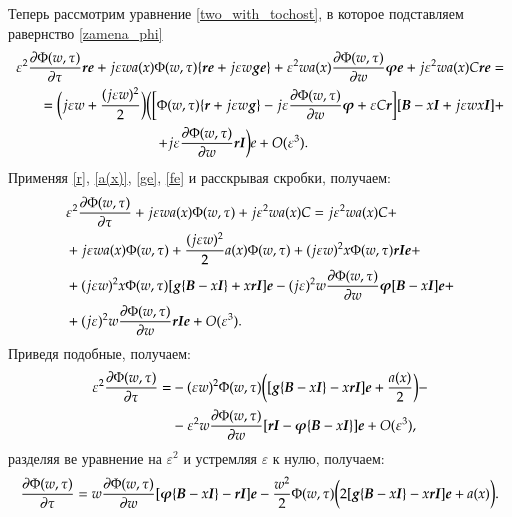 Теперь рассмотрим уравнение \eqref{two_with_tochost}, в которое подставляем равернство \eqref{zamena_phi}
\begin{align*}
	\varepsilon^2 \pdv{\Phi (w, \tau)}{\tau}\boldsymbol{re}+	j \varepsilon w a(x) \Phi (w, \tau)\{\boldsymbol{re} + j \varepsilon w \boldsymbol{ge}\}
    + \varepsilon^2 w a(x)\pdv{\Phi (w, \tau)}{w} \boldsymbol{\varphi e}+ j\varepsilon^2 w a(x)C\boldsymbol{re} =\\
	=\bigg(j\varepsilon w+\frac{(j\varepsilon w)^2}{2}\bigg)\bigg(\bigg[\Phi (w,\tau)\{\boldsymbol{r}
    +j\varepsilon w\boldsymbol{g}\}-j\varepsilon \pdv{\Phi (w, \tau)}{w}\boldsymbol{\varphi}  
    +\varepsilon C\boldsymbol{r}\bigg][\boldsymbol{B}-x\boldsymbol{I}+j\varepsilon w x \boldsymbol{I}]+ \\
    +j\varepsilon \pdv{\Phi (w, \tau)}{w}\boldsymbol{rI}\bigg)e +O(\varepsilon^3).\hspace{140pt}
\end{align*}
Применяя \eqref{r}, \eqref{a(x)}, \eqref{ge}, \eqref{fe} и расскрывая скробки, получаем:
\begin{align*}
	&\varepsilon^2 \pdv{\Phi (w, \tau)}{\tau}+j \varepsilon w a(x) \Phi (w, \tau)+ j\varepsilon^2 w a(x)C = j\varepsilon^2 w a(x)C+\\
	&+j \varepsilon w a(x) \Phi (w, \tau)+\frac{(j \varepsilon w)^2}{2} a(x) \Phi (w, \tau) + (j \varepsilon w)^2 x \Phi (w, \tau)\boldsymbol{rIe}+\\
	&+(j \varepsilon w)^2 x \Phi (w, \tau)[\boldsymbol{g}\{\boldsymbol{B}-x\boldsymbol{I}\}+x\boldsymbol{rI}]\boldsymbol{e}- (j \varepsilon)^2w \pdv{\Phi (w, \tau)}{w}\boldsymbol{\varphi}[\boldsymbol{B}-x\boldsymbol{I}]\boldsymbol{e}+\\
	&+(j \varepsilon)^2w \pdv{\Phi (w, \tau)}{w}\boldsymbol{rIe}+O(\varepsilon^3).
\end{align*}
Приведя подобные, получаем:
\begin{align*}
	\varepsilon^2\pdv{\Phi (w, \tau)}{\tau} = &- (\varepsilon w)^2 \Phi (w, \tau)
        \bigg([\boldsymbol{g}\{\boldsymbol{B}-x\boldsymbol{I}\}-x\boldsymbol{rI}]\boldsymbol{e}+\frac{a(x)}{2}\bigg)-\\
	&- \varepsilon^2w \pdv{\Phi (w, \tau)}{w}[\boldsymbol{rI} -\boldsymbol{\varphi}\{\boldsymbol{B}-x\boldsymbol{I}\}]\boldsymbol{e}+O(\varepsilon^3),
\end{align*}
разделяя ве уравнение на $\varepsilon^2$ и устремляя $\varepsilon$ к нулю, получаем:
\begin{align*}
	\pdv{\Phi (w, \tau)}{\tau} =w\pdv{\Phi (w, \tau)}{w}[\boldsymbol{\varphi}\{\boldsymbol{B}-x\boldsymbol{I}\}-\boldsymbol{rI}]\boldsymbol{e}- \frac{w^2}{2}\Phi (w, \tau)
        \bigg(2[\boldsymbol{g}\{\boldsymbol{B}-x\boldsymbol{I}\}-x\boldsymbol{rI}]\boldsymbol{e}+ a(x)\bigg).
\end{align*}
